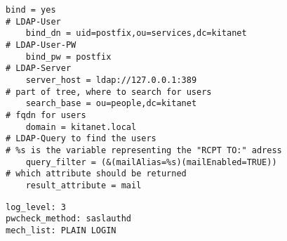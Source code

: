 \begin{lstlisting}[caption={/etc/postfix/ldap\_virtual\_aliases.cf}, label={postfix/aliases.cf}]
	bind = yes
# LDAP-User
	bind_dn = uid=postfix,ou=services,dc=kitanet
# LDAP-User-PW
	bind_pw = postfix
# LDAP-Server
	server_host = ldap://127.0.0.1:389
# part of tree, where to search for users
	search_base = ou=people,dc=kitanet
# fqdn for users
	domain = kitanet.local
# LDAP-Query to find the users
# %s is the variable representing the "RCPT TO:" adress
	query_filter = (&(mailAlias=%s)(mailEnabled=TRUE))
# which attribute should be returned
	result_attribute = mail
\end{lstlisting}

\begin{lstlisting}[caption={/etc/postfix/sasl/smtpd.conf}, label={postfix/sasl}]
log_level: 3
pwcheck_method: saslauthd
mech_list: PLAIN LOGIN
\end{lstlisting}
